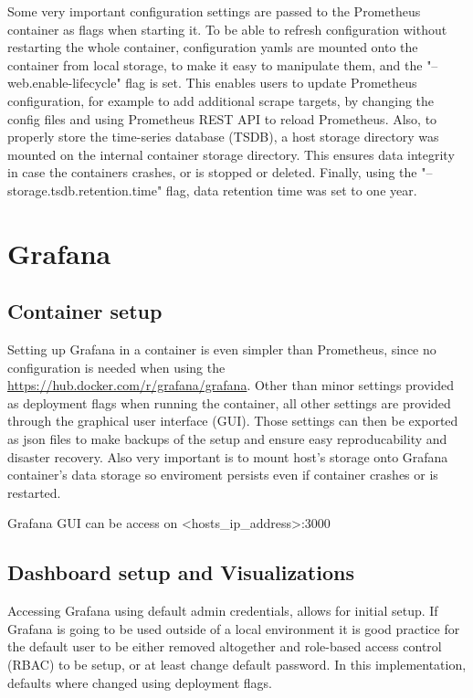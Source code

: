 Some very important configuration settings are passed to the Prometheus container as flags when starting it. To be able to refresh configuration without restarting the whole container, configuration yamls are mounted onto the container from local storage, to make it easy to manipulate them, and the "--web.enable-lifecycle" flag is set. This enables users to update Prometheus configuration, for example to add additional scrape targets, by changing the config files and using Prometheus REST API to reload Prometheus. Also, to properly store the time-series database (TSDB), a host storage directory was mounted on the internal container storage directory. This ensures data integrity in case the containers crashes, or is stopped or deleted. Finally, using the "--storage.tsdb.retention.time" flag, data retention time was set to one year.

\section{Grafana}
\subsection{Container setup}
Setting up Grafana in a container is even simpler than Prometheus, since no configuration is needed when using the \href{official Grafana docker image}{https://hub.docker.com/r/grafana/grafana}.
Other than minor settings provided as deployment flags when running the container, all other settings are provided through the graphical user interface (GUI). Those settings can then be exported as json files to make backups of the setup and ensure easy reproducability and disaster recovery.
Also very important is to mount host's storage onto Grafana container's data storage so enviroment persists even if container crashes or is restarted.

Grafana GUI can be access on <hosts\_ip\_address>:3000

\subsection{Dashboard setup and Visualizations}
Accessing Grafana using default admin credentials, allows for initial setup. If Grafana is going to be used outside of a local environment it is good practice for the default user to be either removed altogether and role-based access control (RBAC) to be setup, or at least change default password. In this implementation, defaults where changed using deployment flags.

